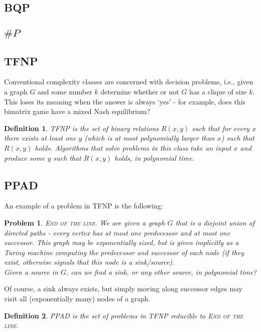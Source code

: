 \documentclass[]{article}
\theoremstyle{break}
\theoremstyle{break}
\newtheorem{definition}{Definition}[section]
\newtheorem{problem}{Problem}[section]
\begin{document}
\subsection{BQP}

\subsection{$\# P$}

\subsection{TFNP}
Conventional complexity classes are concerned with decision problems, i.e., given a graph $G$ and some number $k$ determine whether or not $G$ has a clique of size $k$.\\
This loses its meaning when the answer is always `yes' - for example, does this bimatrix game have a mixed Nash equilibrium?\\
\begin{definition}
	TFNP is the set of binary relations $R(x, y)$ such that for every $x$ there exists at least one $y$ (which is at most polynomially larger than $x$) such that $R(x,y)$ holds.
	Algorithms that solve problems in this class take an input $x$ and produce some $y$ such that $R(x, y)$ holds, in polynomial time.
\end{definition}

\subsection{PPAD}
An example of a problem in TFNP is the following:
\begin{problem}
	\textsc{End of the line.} We are given a graph $G$ that is a disjoint union of directed paths - every vertex has at most one predecessor and at most one successor. This graph may be exponentially sized,
	but is given implicitly as a Turing machine computing the predecessor and successor of each node (if they exist, otherwise signals that this node is a sink/source).\\
	Given a source in $G$, can we find a sink, or any other source, in polynomial time?
\end{problem}

Of course, a sink always exists, but simply moving along successor edges may visit all (exponentially many) nodes of a graph.

\begin{definition}
	PPAD is the set of problems in TFNP reducible to \textsc{End of the line.}
\end{definition}
\end{document}
